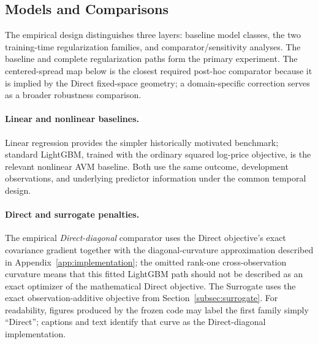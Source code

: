 \documentclass[10pt]{article}
\theoremstyle{definition}
\newcommand{\1}{\mathbf{1}}
\begin{document}
\subsection{Models and Comparisons}
\label{subsec:comparators}


The empirical design distinguishes three layers: baseline model classes, the two training-time regularization families, and comparator/sensitivity analyses. The baseline and complete regularization paths form the primary experiment. The centered-spread map below is the closest required post-hoc comparator because it is implied by the Direct fixed-space geometry; a domain-specific correction serves as a broader robustness comparison.

\paragraph{Linear and nonlinear baselines.}

Linear regression provides the simpler historically motivated benchmark; standard LightGBM, trained with the ordinary squared log-price objective, is the relevant nonlinear AVM baseline. Both use the same outcome, development observations, and underlying predictor information under the common temporal design.

\paragraph{Direct and surrogate penalties.}


The empirical \emph{Direct-diagonal} comparator uses the Direct objective's exact covariance gradient together with the diagonal-curvature approximation described in Appendix~\ref{app:implementation}; the omitted rank-one cross-observation curvature means that this fitted LightGBM path should not be described as an exact optimizer of the mathematical Direct objective. The Surrogate uses the exact observation-additive objective from Section~\ref{subsec:surrogate}. For readability, figures produced by the frozen code may label the first family simply ``Direct''; captions and text identify that curve as the Direct-diagonal implementation.
\end{document}

